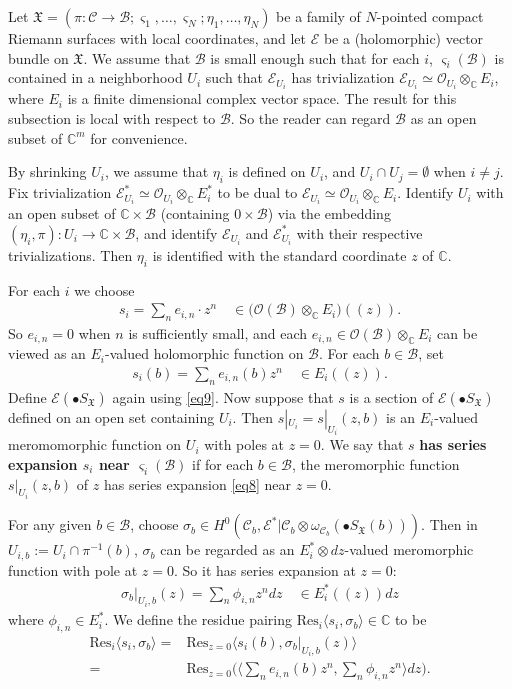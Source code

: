 \documentclass[12pt,a4paper,notitlepage]{report}
\theoremstyle{definition}
\theoremstyle{plain}
\newcommand{\fk}{\mathfrak}
\newcommand{\mc}{\mathcal}
\newcommand{\Res}{\mathrm{Res}}
\newcommand{\bk}[1]{\langle {#1}\rangle}
\newcommand{\scr}{\mathscr}
\newcommand{\sgm}{\varsigma}
\newcommand{\SX}{S_{\fk X}}
\newcommand{\mbb}{\mathbb}
\numberwithin{equation}{section}
\begin{document}
Let $\fk X=(\pi:\mc C\rightarrow\mc B;\sgm_1,\dots,\sgm_N;\eta_1,\dots,\eta_N)$ be a family of $N$-pointed compact Riemann surfaces with local coordinates, and let $\scr E$ be a (holomorphic) vector bundle on $\fk X$. We assume that $\mc B$ is small enough such that for  each $i$, $\sgm_i(\mc B)$ is contained in a neighborhood $U_i$ such that $\scr E_{U_i}$ has trivialization $\scr E_{U_i}\simeq \scr O_{U_i}\otimes_{\mathbb C}E_i$, where $E_i$ is a finite dimensional complex vector space. The result for this subsection is local with respect to $\mc B$. So the reader can regard $\mc B$ as an open subset of $\mbb C^m$ for convenience.

By shrinking $U_i$, we assume that $\eta_i$ is defined on $U_i$, and $U_i\cap U_j=\emptyset$ when $i\neq j$. Fix trivialization $\scr E^*_{U_i}\simeq \scr O_{U_i}\otimes_{\mathbb C}E_i^*$ to be dual to $\scr E_{U_i}\simeq \scr O_{U_i}\otimes_{\mathbb C}E_i$. Identify $U_i$ with an open subset of $\mathbb C\times\mc B$ (containing $0\times\mc B$) via the embedding $(\eta_i,\pi):U_i\rightarrow \mathbb C\times\mc B$, and identify $\scr E_{U_i}$ and $\scr E^*_{U_i}$ with their respective trivializations. Then $\eta_i$ is identified with the standard coordinate $z$ of $\mbb C$.

For each $i$ we choose 
\begin{align}
s_i=\sum_n e_{i,n}\cdot z^n\quad\in \big(\scr O(\mc B)\otimes_{\mathbb C}E_i\big)((z)).\label{eq10}
\end{align}
So $e_{i,n}=0$ when $n$ is sufficiently small, and each $e_{i,n}\in\scr O(\mc B)\otimes_{\mathbb C}E_i$ can be viewed as an $E_i$-valued holomorphic function on $\mc B$. For each $b\in\mc B$, set
\begin{align}
s_i(b)=\sum_n e_{i,n}(b)z^n\quad\in E_i((z)).\label{eq8}
\end{align}
Define $\scr E(\bullet\SX)$ again using \eqref{eq9}. Now suppose that $s$ is a section of $\scr E(\bullet\SX)$ defined on an open set containing $U_i$.  Then $s|_{U_i}=s|_{U_i}(z,b)$ is an $E_i$-valued meromomorphic function on $U_i$ with poles at $z=0$. We say that $s$ \textbf{has series expansion $s_i$ near $\sgm_i(\mc B)$} if for each $b\in \mc B$, the meromorphic function $s|_{U_i}(z,b)$ of $z$ has series expansion \eqref{eq8} near $z=0$.

For any given $b\in\mc B$, choose $\sigma_b\in H^0(\mc C_b,\scr E^*|\mc C_b\otimes\omega_{\mc C_b}(\bullet\SX(b)))$. Then in $U_{i,b}:=U_i\cap\pi^{-1}(b)$, $\sigma_b$ can be regarded as an $E_i^*\otimes dz$-valued meromorphic function with pole at $z=0$. So it has series expansion at $z=0$:
\begin{align}
\sigma_b|_{U_i,b}(z)=\sum_n \phi_{i,n}z^ndz \quad\in E_i^*((z))dz
\end{align}
where $\phi_{i,n}\in E_i^*$. We define the residue pairing $\Res_i\bk{s_i,\sigma_b}\in\mathbb C$ to be
\begin{align}
\Res_i \bk{s_i,\sigma_b}=&\Res_{z=0}\langle s_i(b),\sigma_b|_{U_i,b}(z) \rangle\nonumber\\
=&\Res_{z=0}\bigg(\Big\langle \sum_n e_{i,n}(b)z^n, \sum_n \phi_{i,n}z^n  \Big\rangle dz\bigg).\label{eq217}
\end{align} 
\end{document}
